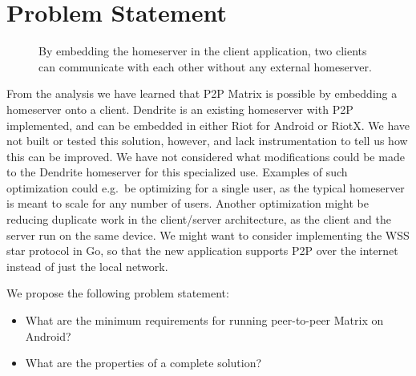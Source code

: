 \section{Problem Statement}
\begin{figure}
      \centering
      \resizebox{0.4\linewidth}{!}{}
      \caption{
            By embedding the homeserver in the client application, two clients can communicate with each other without any external homeserver.
      }
      \label{fig:p2p-embed}
\end{figure}
From the analysis we have learned that \ac{P2P} Matrix is possible by embedding a homeserver onto a client.
Dendrite is an existing homeserver with \ac{P2P} implemented, and can be embedded in either Riot for Android or RiotX.
We have not built or tested this solution, however, and lack instrumentation to tell us how this can be improved.
We have not considered what modifications could be made to the Dendrite homeserver for this specialized use.
Examples of such optimization could e.g.~be optimizing for a single user, as the typical homeserver is meant to scale for any number of users.
Another optimization might be reducing duplicate work in the client/server architecture, as the client and the server run on the same device.
We might want to consider implementing the WSS star protocol in Go, so that the new application supports \ac{P2P} over the internet instead of just the local network.


We propose the following problem statement:\\
\begin{itemize}
      \item What are the minimum requirements for running peer-to-peer Matrix on Android?
      \item What are the properties of a complete solution?
\end{itemize}